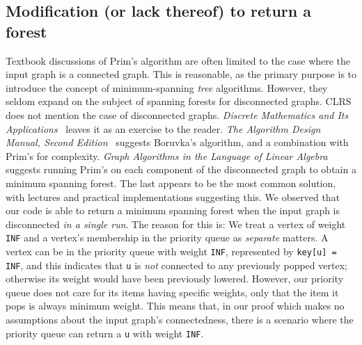 \subsection{Modification (or lack thereof) to return a forest}

Textbook discussions of Prim's algorithm are often limited to the case where the input graph is a connected graph. This is reasonable, as the primary purpose is to introduce the concept of minimum-spanning \textit{tree} algorithms. However, they seldom expand on the subject of spanning forests for disconnected graphs. CLRS does not mention the case of disconnected graphs. \textit{Discrete Mathematics and Its Applications}~\cite{rozen} leaves it as an exercise to the reader. \textit{The Algorithm Design Manual, Second Edition}~\cite{DBLP:books/daglib/0022194} suggests Boruvka’s algorithm, and a combination with Prim's for complexity. \textit{Graph Algorithms in the Language of Linear Algebra}~\cite{kepnergilbert} suggests running Prim's on each component of the disconnected graph to obtain a minimum spanning forest. The last appears to be the most common solution, with lectures and practical implementations suggesting this.
\newline\newline
We observed that our code is able to return a minimum spanning forest when the input graph is disconnected \textit{in a single run}. The reason for this is: We treat a vertex of weight \texttt{INF} and a vertex's membership in the priority queue as \textit{separate} matters. A vertex can be in the priority queue with weight \texttt{INF}, represented by \texttt{key[u] = INF}, and this indicates that \texttt{u} is \textit{not} connected to any previously popped vertex; otherwise its weight would have been previously lowered. However, our priority queue does not care for its items having specific weights, only that the item it pops is always minimum weight. This means that, in our proof which makes no assumptions about the input graph's connectedness, there is a scenario where the priority queue can return a \texttt{u} with weight \texttt{INF}.

